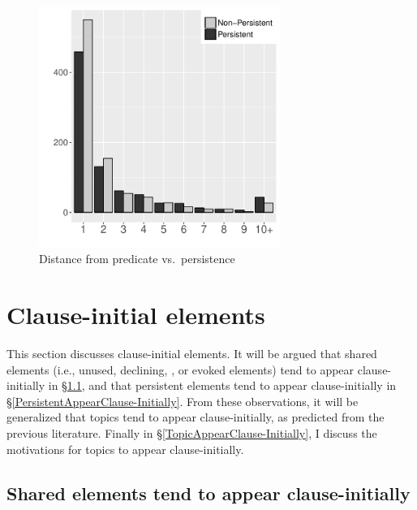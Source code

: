 \begin{figure}
	\includegraphics[width=0.7\textwidth]{figure/DiffPersistence.pdf}
	\caption{Distance from predicate vs.\ persistence}
	\label{DiffPerF}
\end{figure}

\section{Clause-initial elements}\label{WOSentInitEles}

This section discusses clause-initial elements.
It will be argued that shared elements (i.e., unused, declining, , or evoked elements) tend to appear clause-initially
in \S \ref{GivenAppearClause-Initially},
and that
persistent elements tend to appear clause-initially
in \S \ref{PersistentAppearClause-Initially}.
From these observations,
it will be generalized that topics tend to appear clause-initially,
as predicted from the previous literature.
Finally in \S \ref{TopicAppearClause-Initially},
I discuss the motivations for topics to appear clause-initially.


\subsection{Shared elements tend to appear clause-initially}\label{GivenAppearClause-Initially}

